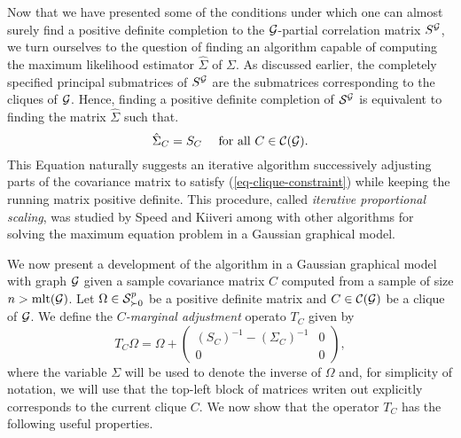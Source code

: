 Now that we have presented some of the conditions under which one can almost surely find a positive definite completion to the $\G$-partial correlation matrix $S^\G$, we turn ourselves to the question of finding an algorithm capable of computing the maximum likelihood estimator $\hat\Sigma$ of $\Sigma$. As discussed earlier, the completely specified principal submatrices of $S^\G$ are the submatrices corresponding to the cliques of $\G$. Hence, finding a positive definite completion of $\S^\G$ is equivalent to finding the matrix $\hat\Sigma$ such that.
\begin{equation} \label{eq-clique-constraint}
    \hat\Sigma_C = S_C \ \ \ \ \t{for all } C \in \c{C}(\G).
\end{equation}
This Equation naturally suggests an iterative algorithm successively adjusting parts of the covariance matrix to satisfy (\ref{eq-clique-constraint}) while keeping the running matrix positive definite. This procedure, called \textit{iterative proportional scaling}, was studied by Speed and Kiiveri \cite{speed1986gaussian} among with other algorithms for solving the maximum equation problem in a Gaussian graphical model. 

We now present a development of the algorithm in a Gaussian graphical model with graph $\G$ given a sample covariance matrix $C$ computed from a sample of size $n > \t{mlt}(\G)$. Let $\Omega \in \S^p_{\succ 0}$ be a positive definite matrix and $C \in \c{C}(\G)$ be a clique of $\G$. We define the \textit{$C$-marginal adjustment} operato $T_C$ given by
\begin{equation} \label{eq-tc-1}
    T_C \Omega = \Omega + \begin{pmatrix}
        (S_C)^{-1} - (\Sigma_C)^{-1} & 0\\
        0 & 0 
        \end{pmatrix},
\end{equation}
where the variable $\Sigma$ will be used to denote the inverse of $\Omega$ and, for simplicity of notation, we will use that the top-left block of matrices writen out explicitly corresponds to the current clique $C$. We now show that the operator $T_C$ has the following useful properties.

